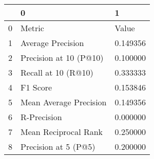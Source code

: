 \begin{tabular}{lll}
\toprule
 & 0 & 1 \\
\midrule
0 & Metric & Value \\
1 & Average Precision & 0.149356 \\
2 & Precision at 10 (P@10) & 0.100000 \\
3 & Recall at 10 (R@10) & 0.333333 \\
4 & F1 Score & 0.153846 \\
5 & Mean Average Precision & 0.149356 \\
6 & R-Precision & 0.000000 \\
7 & Mean Reciprocal Rank & 0.250000 \\
8 & Precision at 5 (P@5) & 0.200000 \\
\bottomrule
\end{tabular}
